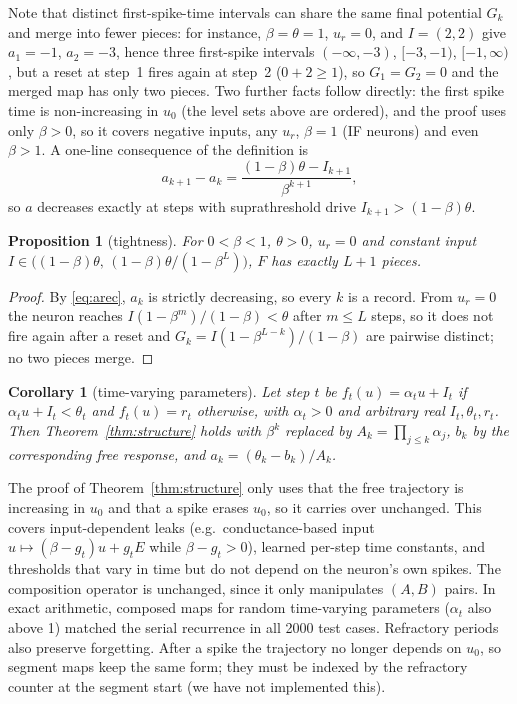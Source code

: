 \documentclass[10pt]{article}
\newtheorem{proposition}[theorem]{Proposition}
\newtheorem{corollary}[theorem]{Corollary}
\theoremstyle{remark}
\begin{document}
Note that distinct first-spike-time intervals can share the same final potential $G_k$ and merge into fewer pieces: for instance, $\beta=\theta=1$, $u_r=0$, and $I=(2,2)$ give $a_1=-1$, $a_2=-3$, hence three first-spike intervals $(-\infty,-3)$, $[-3,-1)$, $[-1,\infty)$, but a reset at step~1 fires again at step~2 ($0+2\ge 1$), so $G_1=G_2=0$ and the merged map has only two pieces. Two further facts follow directly: the first spike time is non-increasing in $u_0$ (the level sets above are ordered), and the proof uses only $\beta>0$, so it covers negative inputs, any $u_r$, $\beta=1$ (IF neurons) and even $\beta>1$. A one-line consequence of the definition is
\begin{equation}
a_{k+1}-a_k=\frac{(1-\beta)\theta-I_{k+1}}{\beta^{k+1}},
\label{eq:arec}
\end{equation}
so $a$ decreases exactly at steps with suprathreshold drive $I_{k+1}>(1-\beta)\theta$.

\begin{proposition}[tightness]
\label{prop:tight}
For $0<\beta<1$, $\theta>0$, $u_r=0$ and constant input $I\in\big((1-\beta)\theta,\,(1-\beta)\theta/(1-\beta^L)\big)$, $F$ has exactly $L+1$ pieces.
\end{proposition}
\begin{proof}
By \eqref{eq:arec}, $a_k$ is strictly decreasing, so every $k$ is a record. From $u_r=0$ the neuron reaches $I(1-\beta^m)/(1-\beta)<\theta$ after $m\le L$ steps, so it does not fire again after a reset and $G_k=I(1-\beta^{L-k})/(1-\beta)$ are pairwise distinct; no two pieces merge.
\end{proof}

\begin{corollary}[time-varying parameters]
\label{cor:tv}
Let step $t$ be $f_t(u)=\alpha_tu+I_t$ if $\alpha_tu+I_t<\theta_t$ and $f_t(u)=r_t$ otherwise, with $\alpha_t>0$ and arbitrary real $I_t,\theta_t,r_t$. Then Theorem~\ref{thm:structure} holds with $\beta^k$ replaced by $A_k=\prod_{j\le k}\alpha_j$, $b_k$ by the corresponding free response, and $a_k=(\theta_k-b_k)/A_k$.
\end{corollary}
The proof of Theorem~\ref{thm:structure} only uses that the free trajectory is increasing in $u_0$ and that a spike erases $u_0$, so it carries over unchanged. This covers input-dependent leaks (e.g.\ conductance-based input $u\mapsto(\beta-g_t)u+g_tE$ while $\beta-g_t>0$), learned per-step time constants, and thresholds that vary in time but do not depend on the neuron's own spikes. The composition operator is unchanged, since it only manipulates $(A,B)$ pairs. In exact arithmetic, composed maps for random time-varying parameters ($\alpha_t$ also above 1) matched the serial recurrence in all 2000 test cases. Refractory periods also preserve forgetting. After a spike the trajectory no longer depends on $u_0$, so segment maps keep the same form; they must be indexed by the refractory counter at the segment start (we have not implemented this).
\end{document}
